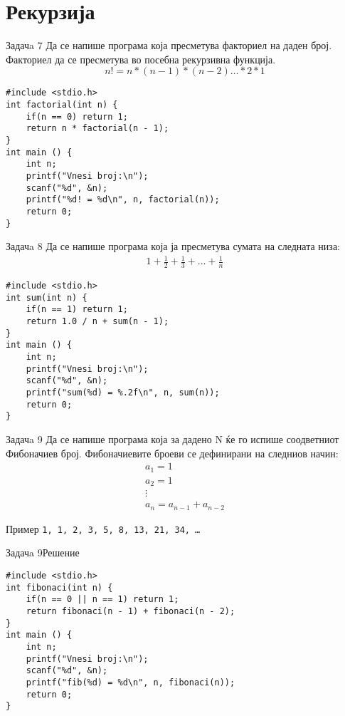 \section{Рекурзија}

\begin{frame}[fragile]{Задачa 7}
Да се напише програма која пресметува факториел на даден број. Факториел да
се пресметува во посебна рекурзивна функција.
\[
   n! = n * (n - 1) * (n - 2) \ldots * 2 * 1
\]
\pause
\begin{lstlisting}
#include <stdio.h>
int factorial(int n) {
    if(n == 0) return 1;
    return n * factorial(n - 1);
}
int main () {
    int n;
    printf("Vnesi broj:\n");
    scanf("%d", &n);
    printf("%d! = %d\n", n, factorial(n));
    return 0;
}
\end{lstlisting}
\end{frame}

\begin{frame}[fragile]{Задачa 8}
Да се напише програма која ја пресметува сумата на следната низа:
\[
    \begin{array}{l}
    1 + \frac{1}{2} + \frac{1}{3} + \ldots + \frac{1}{n}
    \end{array}
\]
\pause
\begin{lstlisting}
#include <stdio.h>
int sum(int n) {
    if(n == 1) return 1;
    return 1.0 / n + sum(n - 1);
}
int main () {
    int n;
    printf("Vnesi broj:\n");
    scanf("%d", &n);
    printf("sum(%d) = %.2f\n", n, sum(n));
    return 0;
}
\end{lstlisting}
\end{frame}



\begin{frame}{Задачa 9}
Да се напише програма која за дадено N ќе го испише соодветниот Фибоначиев
број. Фибоначиевите броеви се дефинирани на следниов начин:
\[
   \begin{array}{l}
   a_1 = 1\\
   a_2 = 1\\ 
   \vdots\\
   a_n = a_{n - 1} + a_{n - 2}
   \end{array}
\]
\begin{exampleblock}{Пример}
\texttt{1, 1, 2, 3, 5, 8, 13, 21, 34, \ldots} 
\end{exampleblock}
\end{frame}


\begin{frame}[fragile]{Задачa 9}{Решение}
\begin{lstlisting}
#include <stdio.h>
int fibonaci(int n) {
    if(n == 0 || n == 1) return 1;
    return fibonaci(n - 1) + fibonaci(n - 2);
}
int main () {
    int n;
    printf("Vnesi broj:\n");
    scanf("%d", &n);
    printf("fib(%d) = %d\n", n, fibonaci(n));
    return 0;
}
\end{lstlisting}
\end{frame}


